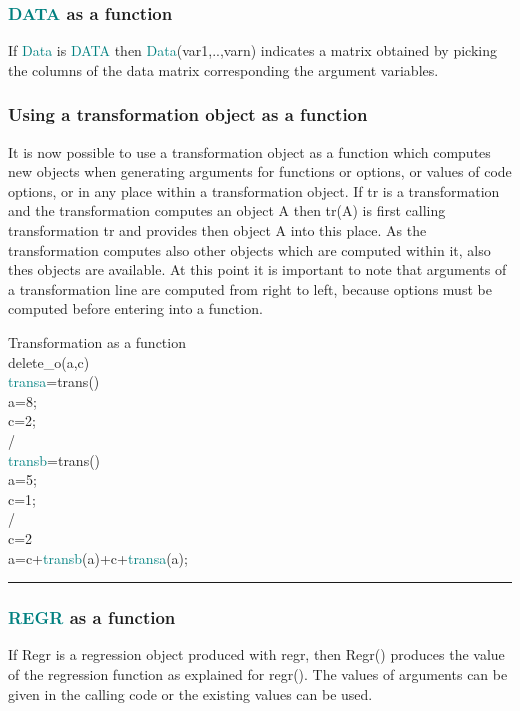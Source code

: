 {\subsubsection{\textcolor{teal}{DATA} as a function} 
\label{datafunc} 
If \textcolor{teal}{Data} is  \textcolor{teal}{DATA} then \textcolor{teal}{Data}(var1,..,varn) indicates a matrix obtained by picking 
the columns of the data matrix corresponding the argument variables. 
\subsubsection{Using a transformation object as a function} 
\label{transfunc} 
It is now possible to use a transformation object as a function which computes new 
objects when generating arguments for functions or options, 
or values of code options, or in any place within a transformation object. 
If {tr} is a transformation and the transformation computes an object {A} then 
{tr(A)} is first calling transformation {tr} and provides then object {A} into this place. 
As the transformation computes also other objects which are computed within it, also thes objects 
are available. At this point it is important to note that arguments of 
a transformation line are computed from right to left, because options must be computed before 
entering into a function. 
\singlespacing 
\begin{example}[transfunc]Transformation as a function\\ 
\label{transfunc} 
\noindent \textcolor{VioletRed}{delete\_o}(a,c)\\ 
\textcolor{teal}{transa}=\textcolor{VioletRed}{trans}()\\ 
a=8;\\ 
c=2;\\ 
/   \\ 
\textcolor{teal}{transb}=\textcolor{VioletRed}{trans}()\\ 
a=5;\\ 
c=1;\\ 
/   \\ 
c=2\\ 
a=c+\textcolor{teal}{transb}(a)+c+\textcolor{teal}{transa}(a);\\ 
\end{example} 
\vspace{-7mm} \rule{5cm}{0.1pt} 
\onehalfspacing 
\subsubsection{\textcolor{teal}{REGR} as a function} 
\label{regrfunc} 
If Regr is a regression object produced with regr, then Regr() produces 
the value of the regression function as explained for \textcolor{VioletRed}{regr}(). The values of arguments 
can be given in the calling code or the existing values can be used. 
}
